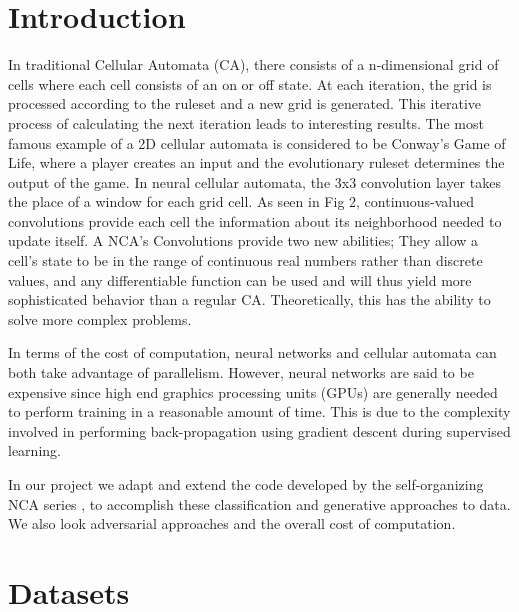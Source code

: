 \documentclass[conference]{IEEEtran}
\begin{document}
\section{Introduction}

In traditional Cellular Automata (CA), there consists of a n-dimensional grid of cells where each cell consists of an on or off state. At each iteration, the grid is processed according to the ruleset and a new grid is generated. This iterative process of calculating the next iteration leads to interesting results. The most famous example of a 2D cellular automata is considered to be Conway's Game of Life, where a player creates an input and the evolutionary ruleset determines the output of the game. In neural cellular automata, the 3x3 convolution layer takes the place of a window for each grid cell. As seen in Fig 2, continuous-valued convolutions provide each cell the information about its neighborhood needed to update itself. A NCA's Convolutions provide two new abilities; They allow a cell's state to be in the range of continuous real numbers rather than discrete values, and any differentiable function can be used and will thus yield more sophisticated behavior than a regular CA. Theoretically, this has the ability to solve more complex problems. 

In terms of the cost of computation, neural networks and cellular automata can both take advantage of parallelism. However, neural networks are said to be expensive since high end graphics processing units (GPUs) are generally needed to perform training in a reasonable amount of time. This is due to the complexity involved in performing back-propagation using gradient descent during supervised learning.

In our project we adapt and extend the code developed by the self-organizing NCA series \cite{selforg}, to accomplish these classification and generative approaches to data. We also look adversarial approaches and the overall cost of computation.



\section{Datasets}
\end{document}
